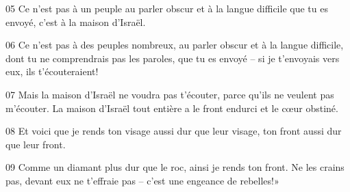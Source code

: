 
05 Ce n’est pas à un peuple au parler obscur et à la langue difficile que tu es envoyé, c’est à la maison d’Israël.

06 Ce n’est pas à des peuples nombreux, au parler obscur et à la langue difficile, dont tu ne comprendrais pas les paroles, que tu es envoyé – si je t’envoyais vers eux, ils t’écouteraient!

07 Mais la maison d’Israël ne voudra pas t’écouter, parce qu’ils ne veulent pas m’écouter. La maison d’Israël tout entière a le front endurci et le cœur obstiné.

08 Et voici que je rends ton visage aussi dur que leur visage, ton front aussi dur que leur front.

09 Comme un diamant plus dur que le roc, ainsi je rends ton front. Ne les crains pas, devant eux ne t’effraie pas – c’est une engeance de rebelles!»
